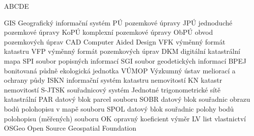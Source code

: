 
\begin{seznamzkratek}{ABCDE}

	      {GIS}
	      {Geografický informační systém}
	      {PÚ}
	      {pozemkové úpravy}
	      {JPÚ}
	      {jednoduché pozemkové úpravy}
	      {KoPÚ}
	      {komplexní pozemkové úpravy}
	      {ObPÚ}
	      {obvod pozemkových úprav}
	      {CAD}
	      {Computer Aided Design}
	      {VFK}
	      {výměnný formát katastru}
	      {VFP}
	      {výměnný formát pozemkových úprav}
	      {DKM}
	      {digitální katastrální mapa}
	      {SPI}
	      {soubor popisných informací}
	      {SGI}
	      {soubor geodetických informací}
	      {BPEJ}
	      {bonitovaná půdně ekologická jednotka}
	      {VÚMOP}
	      {Výzkumný ústav meliorací a ochrany půdy}
	      {ISKN}
	      {informační systém katastru nemovitostí}
	      {KN}
	      {katastr nemovitostí}
	      {S-JTSK}
	      {souřadnicový systém Jednotné trigonometrické sítě katastrální}
	      {PAR}
	      {datový blok parcel souboru }
	      {SOBR}
	      {datový blok souřadnic obrazu bodů polohopisu v mapě souboru }
	      {SPOL}
	      {datový blok souřadnic polohy bodů polohopisu (měřených) souboru }
	      {OK}
	      {opravný koeficient výměr}
	      {LV}
	      {list vlastnictví}
	      {OSGeo}
	      {Open Source Geospatial Foundation}
	      
\end{seznamzkratek}